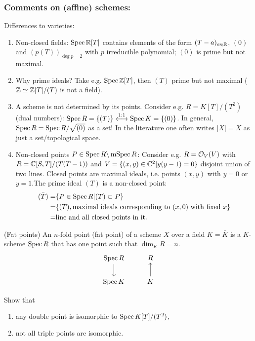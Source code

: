 \documentclass[a4paper,11pt]{article}
\begin{document}
				{\color{gray}\subsubsection*{Comments on (affine) schemes:}
				
					Differences to varieties:
					\begin{enumerate}
						\item Non-closed fields: $\operatorname{Spec} \mathbb{R}[T]$ contains elements of the form $(T-a)_{a\in\mathbb{R}}$, $(0)$ and $(p(T))_{\deg p=2}$ with $p$ irreducible polynomial; $(0)$ is prime but not maximal.
						\item Why prime ideals? Take e.g. $\operatorname{Spec}\mathbb{Z}[T]$, then $(T)$ prime but not maximal ($\mathbb{Z}\simeq\mathbb{Z}[T]/(T)$ is not a field).
						\item A scheme is not determined by its points. Consider e.g. $R=K[T]/(T^2)$ (dual numbers): $\operatorname{Spec} R=\{(T)\}\overset{1:1}{\longleftrightarrow}\operatorname{Spec} K=\{(0)\}$. In general, $\operatorname{Spec} R=\operatorname{Spec} R/\sqrt{(0)}$ as a set! In the literature one often writes $|X|=X$ as just a set/topological space.
						\item Non-closed points $P\in\operatorname{Spec} R\backslash\operatorname{mSpec} R$: Consider e.g. $R=\mathcal{O}_V(V)$ with $R=\mathbb{C}[S,T]/(T(T-1))$ and $V=\{(x,y)\in\mathbb{C}^2|y(y-1)=0\}$ disjoint union of two lines. Closed points are maximal ideals, i.e. points $(x,y)$ with $y=0$ or $y=1$.The prime ideal $(T)$ is a non-closed point:
						\begin{align*}
							\bar{(T)}=&\{P\in\operatorname{Spec} R|(T)\subset P\}\\
							=&\{(T),\text{maximal ideals corresponding to }(x,0)\text{ with fixed }x\}\\
							=&\text{line and all closed points in it}.
						\end{align*}
					\end{enumerate}

					\begin{defi}
						(Fat points) An $n$-fold point (fat point) of a scheme $X$ over a field $K=\bar{K}$ is a $K$-scheme $\operatorname{Spec} R$ that has one point such that $\dim_KR=n$.
						\begin{equation*}
							\begin{tikzcd}
								\spec R\ar[d] & R\\
								\spec K & K\ar[u]
							\end{tikzcd}
						\end{equation*}
					\end{defi}

					\begin{exc}
						Show that
						\begin{enumerate}
							\item any double point is isomorphic to $\operatorname{Spec} K[T]/(T^2)$,
							\item not all triple points are isomorphic.
						\end{enumerate}
					\end{exc}

}
\end{document}
